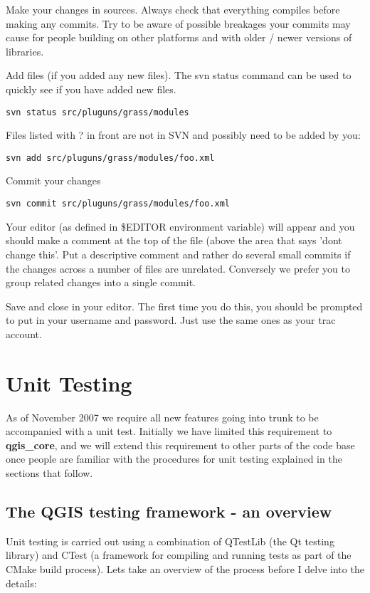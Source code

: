 Make your changes in sources. Always check that everything compiles before
making any commits.  Try to be aware of possible breakages your commits may
cause for people building on other platforms and with older / newer versions of
libraries.

Add files (if you added any new files). The svn status command can be used to
quickly see if you have added new files.

\begin{verbatim}
svn status src/pluguns/grass/modules
\end{verbatim}

Files listed with ? in front are not in SVN and possibly need to be added by
you:

\begin{verbatim}
svn add src/pluguns/grass/modules/foo.xml
\end{verbatim}

Commit your changes

\begin{verbatim}
svn commit src/pluguns/grass/modules/foo.xml
\end{verbatim}

Your editor (as defined in \$EDITOR environment variable) will appear and you
should make a comment at the top of the file (above the area that says 'dont
change this'. Put a descriptive comment and rather do several small commits if
the changes across a number of files are unrelated. Conversely we prefer you to
group related changes into a single commit.

Save and close in your editor. The first time you do this, you should be
prompted to put in your username and password. Just use the same ones as your
trac account.


\section{Unit Testing}
As of November 2007 we require all new features going into trunk to be
accompanied with a unit test. Initially we have limited this requirement to
\textbf{qgis\_core}, and we will extend this requirement to other parts of the code base
once people are familiar with the procedures for unit testing explained in the
sections that follow.

\subsection{The QGIS testing framework  - an overview}
Unit testing is carried out using a combination of QTestLib (the Qt testing
library) and CTest (a framework for compiling and running tests as part of the
CMake build process).  Lets take an overview of the process before I delve into
the details:

